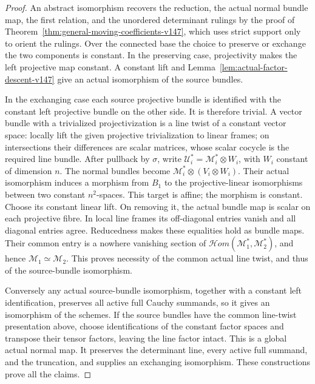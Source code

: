 \documentclass[11pt,reqno]{amsart}
\numberwithin{equation}{section}
\theoremstyle{definition}\newtheorem{definition}[theorem]{Definition}
\theoremstyle{remark}\newtheorem{remark}[theorem]{Remark}
\begin{document}
\begin{proof}
An abstract isomorphism recovers the reduction, the actual normal
bundle map, the first relation, and the unordered determinant
rulings by the proof of
Theorem~\ref{thm:general-moving-coefficients-v147}, which uses
strict support only to orient the rulings.  Over the connected
base the choice to preserve or exchange the two components is
constant.  In the preserving case, projectivity makes the left
projective map constant.  A constant lift and
Lemma~\ref{lem:actual-factor-descent-v147} give an actual
isomorphism of the source bundles.

In the exchanging case each source projective bundle is identified
with the constant left projective bundle on the other side.  It
is therefore trivial.  A vector bundle with a trivialized
projectivization is a line twist of a constant vector space:
locally lift the given projective trivialization to linear frames;
on intersections their differences are scalar matrices, whose
scalar cocycle is the required line bundle.  After pullback by
\(\sigma\), write
\(\mathcal U_i^*=\mathcal M_i^*\otimes W_i\), with \(W_i\)
constant of dimension \(n\).  The normal bundles become
\(\mathcal M_i^*\otimes(V_i\otimes W_i)\).
Their actual isomorphism induces a morphism from \(B_1\) to
the projective-linear isomorphisms between two constant
\(n^2\)-spaces.  This target is affine; the morphism is constant.
Choose its constant linear lift.  On removing it, the actual
bundle map is scalar on each projective fibre.  In local line
frames its off-diagonal entries vanish and all diagonal entries
agree.  Reducedness makes these equalities hold as bundle maps.
Their common entry is a nowhere vanishing section of
\(\mathcal Hom(\mathcal M_1^*,\mathcal M_2^*)\), and hence
\(\mathcal M_1\simeq\mathcal M_2\).  This proves necessity
of the common actual line twist, and thus of the source-bundle
isomorphism.

Conversely any actual source-bundle isomorphism, together with a
constant left identification, preserves all active full Cauchy
summands, so it gives an isomorphism of the schemes.  If the
source bundles have the common line-twist presentation above,
choose identifications of the constant factor spaces and
transpose their tensor factors, leaving the line factor intact.
This is a global actual normal map.  It preserves the determinant
line, every active full summand, and the truncation, and supplies
an exchanging isomorphism.  These constructions prove all the
claims.
\end{proof}
\end{document}

